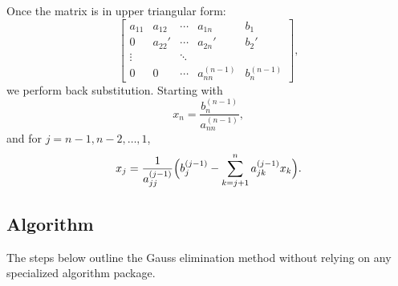 \documentclass[a4paper,12pt]{article}
\begin{document}
	Once the matrix is in upper triangular form:
	\[
	\begin{bmatrix}
		a_{11} & a_{12} & \cdots & a_{1n} & b_1 \\
		0      & a_{22}'& \cdots & a_{2n}'& b_2'\\
		\vdots &        & \ddots &        & \\
		0      &   0    & \cdots & a_{nn}^{(n-1)} & b_n^{(n-1)}
	\end{bmatrix},
	\]
	we perform back substitution. Starting with
	\[
	x_n = \frac{b_n^{(n-1)}}{a_{nn}^{(n-1)}},
	\]
	and for $j = n-1, n-2, \dots, 1$,
	\[
	x_j = \frac{1}{a_{jj}^{(j-1)}} \Bigl(b_j^{(j-1)} - \sum_{k=j+1}^n a_{jk}^{(j-1)} x_k\Bigr).
	\]
	
	\subsection{Algorithm}
	The steps below outline the Gauss elimination method without relying on any specialized algorithm package.
\end{document}

